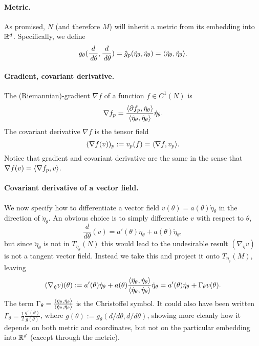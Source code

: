 \documentclass{article}
\begin{document}
	\paragraph{Metric.} As promised, $N$ (and therefore $M$) will inherit a metric from its embedding into $\mathbb{R}^d$. Specifically, we define
	\begin{equation*}
		g_{\theta}(\frac{d}{\,d\theta}, \frac{d}{\,d\theta}) = \hat{g}_{p}(\dot{\eta}_{\theta},\dot{\eta}_{\theta}) =  \langle \dot{\eta}_{\theta}, \dot{\eta}_{\theta} \rangle.
	\end{equation*}

	\paragraph{Gradient, covariant derivative.} 
	The (Riemannian)-gradient $\nabla f$ of a function $f \in C^1(N)$ is
	$$
	\nabla f_p = \frac{\langle \partial f_p, \dot{\eta}_{\theta} \rangle}{\langle \dot{\eta}_{\theta}, \dot{\eta}_{\theta} \rangle} \dot{\eta}_{\theta}.
	$$
	The covariant derivative $\nabla f$ is the tensor field 
	\begin{equation*}
		(\nabla f(v))_{p} := v_p(f) = \langle \nabla f, v_p \rangle.
	\end{equation*}
	Notice that gradient and covariant derivative are the same in the sense that $\nabla f(v) = \langle \nabla f_p, v \rangle$. 
	
	\paragraph{Covariant derivative of a vector field.}
	We now specify how to differentiate a vector field $v(\theta) = a(\theta) \dot{\eta}_{\theta}$ in the direction of $\dot{\eta}_{\theta}$. An obvious choice is to simply differentiate $v$ with respect to $\theta$,
	\begin{equation*}
		\frac{d}{d\theta} (v) = a'(\theta) \dot{\eta}_{\theta} + a(\theta) \ddot{\eta}_{\theta},
	\end{equation*}
	but since $\ddot{\eta}_{\theta}$ is not in $T_{\eta_{\theta}}(N)$ this would lead to the undesirable result $(\nabla_{\dot{\eta}} v)$ is not a tangent vector field. Instead we take this and project it onto $T_{\eta_{\theta}}(M)$, leaving
	\begin{equation*}
		(\nabla_{\dot{\eta}} v)(\theta) := a'(\theta) \dot{\eta}_{\theta} + a(\theta) \frac{\langle \ddot{\eta}_{\theta}, \dot{\eta}_{\theta} \rangle}{\langle \dot{\eta}_{\theta}, \dot{\eta}_{\theta} \rangle} \dot{\eta}_{\theta} = a'(\theta) \dot{\eta}_{\theta} + \Gamma_{\theta} v(\theta). 
	\end{equation*}
	The term $\Gamma_{\theta} = \frac{\langle \ddot{\eta}_{\theta}, \dot{\eta}_{\theta} \rangle}{\langle \dot{\eta}_{\theta}, \dot{\eta}_{\theta} \rangle}$ is the Christoffel symbol. It could also have been written $\Gamma_{\theta} = \frac{1}{2}\frac{g'(\theta)}{g(\theta)}$, where $g(\theta) := g_{\theta}(d/d\theta,d/d\theta)$, showing more cleanly how it depends on both metric and coordinates, but not on the particular embedding into $\mathbb{R}^d$ (except through the metric).
	
\end{document}
